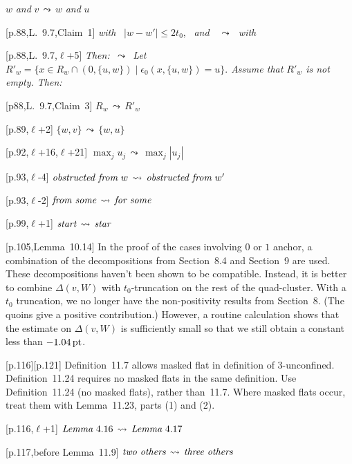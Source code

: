 \documentclass[11pt]{amsart}
\def\op#1{{\text{#1}}}
\def\lto{\ensuremath{\,\leadsto\,}}
\def\line{$\ell$}
\def\text{\hbox}
\def\sz{small} %
\def\rmx{\rm}
\begin{document}
\begin{\sz}
[p.88,Lemma~9.7,\line+2] 
	$w$ {\it  and}  $v$\lto $w$ {\it and}  $u$

	
[p.88,L.~9.7,Claim~1]
	\text{{\it  with }} $|w - w'|\le 2t_0$, \text{ {\it and} }
	\lto \text{ {\it with} }

	
[p.88,L.~9.7,\line+5]
         {\it Then: $\lto$ Let
          $
          R'_w = \{x\in R_w \cap(0,\{u,w\})\mid 
          \epsilon_0(x,\{u,w\}) = u\}.
          $
          Assume that $R'_w$ is not empty. Then:}

[p88,L.~9.7,Claim~3]
        $R_w \lto R'_w$

[p.89,\line+2]
	$
	\{w,v\}\lto\{w,u\}
	$

[p.92,\line+16,\line+21]
   $     \max_j u_j \lto \max_j |u_j|$
	
[p.93,\line-4]
	$
	\text{{\it obstructed from} }w \lto
	\text{{\it obstructed from} }w'
	$
		
[p.93,\line-2]
	$
	\text{{\it from some}} \lto \text{{\it for some}}
	$

[p.99,\line+1]
        $
        \text{{\it start}} \lto \text{{\it star}}
        $

[p.105,Lemma~10.14]  {\rmx In the proof of the cases involving
   $0$ or $1$ anchor, a combination of the decompositions from
   Section~8.4 and Section~9 are used.  These decompositions haven't
   been shown to be compatible.  
   Instead, it is better to combine
   $\Delta(v,W)$ with $t_0$-truncation on the rest of the quad-cluster.
   With a $t_0$ truncation, we no longer have the non-positivity results
   from Section~8.  (The quoins give a positive contribution.) 
   However, a routine calculation shows that
   the estimate on $\Delta(v,W)$ is sufficiently small so that we still
   obtain a constant less than $-1.04\,\op{pt}$.}
   

[p.116][p.121] {\rmx Definition~11.7 allows masked
flat in definition of $3$-unconfined.
Definition~11.24 requires no masked flats
in the same definition.  Use Definition~11.24 (no masked flats), rather than~11.7.  
Where masked flats occur,
treat them with Lemma~11.23, parts (1) and (2).}

[p.116,\line+1] 
	$
	\text{{\it Lemma}}~4.16 \lto \text{{\it Lemma}}~4.17
	$

[p.117,before Lemma~11.9]
	$
	\text{\it two others} \lto \text{\it three others}
	$
	

\end{\sz}
\end{document}
